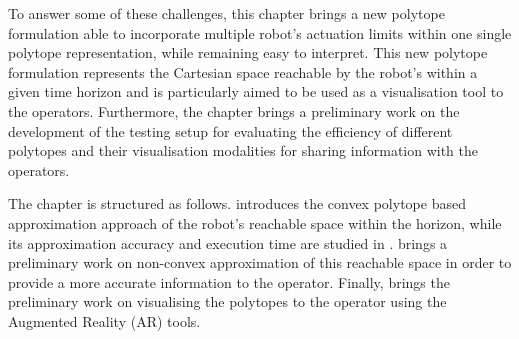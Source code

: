 To answer some of these challenges, this chapter brings a new polytope formulation able to incorporate multiple robot's actuation limits within one single polytope representation, while remaining easy to interpret. This new polytope formulation represents the Cartesian space reachable by the robot's within a given time horizon and is particularly aimed to be used as a visualisation tool to the operators. Furthermore, the chapter brings a preliminary work on the development of the testing setup for evaluating the efficiency of different polytopes and their visualisation modalities for sharing information with the operators. 

The chapter is structured as follows.  introduces the convex polytope based approximation approach of the robot's reachable space within the horizon, while its approximation accuracy and execution time are studied in .  brings a preliminary work on non-convex approximation of this reachable space in order to provide a more accurate information to the operator. Finally,  brings the preliminary work on visualising the polytopes to the operator using the Augmented Reality (AR) tools. 


